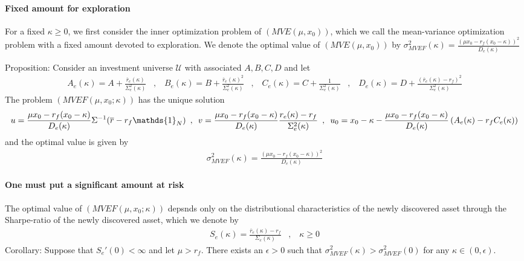 \paragraph{Fixed amount for exploration}
For a fixed $\kappa \geq 0$, we first consider the inner optimization problem of
$(MVE(\mu,x_0))$, which we call the mean-variance optimization problem with a
fixed amount devoted to exploration. We denote the optimal value of $(MVE(\mu,x_0))$
by $\sigma_{MVEF}^2 (\kappa) = \frac{(\mu x_0 - r_f(x_0 - \kappa))^2}{D_e(\kappa)}$


Proposition:
Consider an investment universe $\mathcal{U}$ with associated $A,B,C,D$ and let
\begin{align*}
    A_e (\kappa) = A + \frac{\overline{r}_e (\kappa)}{\Sigma_e^2 (\kappa)}
    \hspace{10pt} , \hspace{10pt}
    B_e (\kappa) = B + \frac{\overline{r}_e (\kappa)^2}{\Sigma_e^2 (\kappa)}
    \hspace{10pt} , \hspace{10pt}
    C_e (\kappa) = C + \frac{1}{\Sigma_e^2 (\kappa)}
    \hspace{10pt} , \hspace{10pt}
    D_e (\kappa) = D + \frac{(\overline{r}_e (\kappa) - r_f)^2}{\Sigma_e^2(\kappa)}
\end{align*}
The problem $(MVEF(\mu,x_0;\kappa))$ has the unique solution
\begin{align*}
    u = \frac{\mu x_0 - r_f(x_0 - \kappa)}{D_e(\kappa)} \Sigma^{-1} (\overline{r} - r_f \mathds{1}_N)
    \hspace{5pt} , \hspace{5pt}
    v = \frac{\mu x_0 - r_f(x_0 - \kappa)}{D_e(\kappa)} \frac{r_e(\kappa) - r_f}{\Sigma_e^2 (\kappa)}
    \hspace{5pt} , \hspace{5pt}
    u_0 = x_0 - \kappa - \frac{\mu x_0 - r_f(x_0 - \kappa)}{D_e(\kappa)} \klammer{A_e(\kappa) - r_f C_e(\kappa)}
\end{align*}
and the optimal value is given by
\begin{align*}
    \sigma_{MVEF}^2 (\kappa) = \frac{(\mu x_0 - r_f (x_0 - \kappa))^2}{D_e(\kappa)}
\end{align*}
\paragraph{One must put a significant amount at risk}
The optimal value of $(MVEF(\mu,x_0;\kappa))$ depsnds only on the distributional
characteristics of the newly discovered asset through the Sharpe-ratio of the
newly discovered asset, which we denote by
\begin{align*}
    S_e (\kappa) = \frac{\overline{r}_e (\kappa) - r_f}{\Sigma_e (\kappa)}
    \hspace{10pt} , \hspace{10pt}
    \kappa \geq 0
\end{align*}
Corollary: Suppose that $S_e'(0) < \infty$ and let $\mu > r_f$. There exists
an $\epsilon > 0$ such that $\sigma_{MVEF}^2 (\kappa) > \sigma_{MVEF}^2 (0)$
for any $\kappa \in (0,\epsilon)$.

